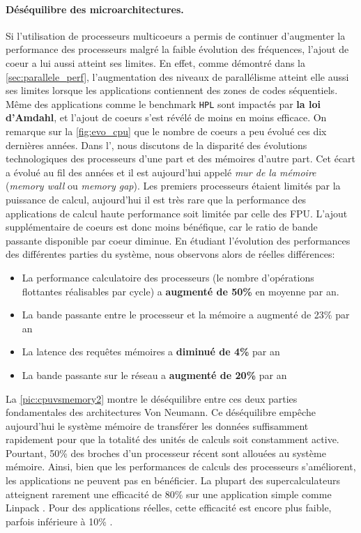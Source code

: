         \paragraph{Déséquilibre des microarchitectures.}  \label{sec:desequilibre_archi}
        Si l'utilisation de processeurs multicoeurs a permis de continuer d'augmenter la performance des processeurs malgré la faible évolution des fréquences, l'ajout de coeur a lui aussi atteint ses limites. En effet, comme démontré dans la \autoref{sec:parallele_perf}, l'augmentation des niveaux de parallélisme atteint elle aussi ses limites lorsque les applications contiennent des zones de codes séquentiels. Même des applications comme le benchmark \verb|HPL| sont impactés par \textbf{la loi d'Amdahl}, et l'ajout de coeurs s'est révélé de moins en moins efficace. On remarque sur la \autoref{fig:evo_cpu} que le nombre de coeurs a peu évolué ces dix dernières années. Dans l', nous discutons de la disparité des évolutions technologiques des processeurs d'une part et des mémoires d'autre part. Cet écart a évolué au fil des années et il est aujourd'hui appelé \textit{mur de la mémoire} \cite{Rojas1997}  (\textit{memory wall} ou \textit{memory gap}). Les premiers processeurs étaient limités par la puissance de calcul, aujourd'hui il est très rare que la performance des applications de calcul haute performance soit limitée par celle des \gls{FPU}. L'ajout supplémentaire de coeurs est donc moins bénéfique, car le ratio de bande passante disponible par coeur diminue. 
        En étudiant l'évolution des performances des différentes parties du système, nous observons alors de réelles différences:             
        \begin{itemize}                 
            \item La performance calculatoire des processeurs (le nombre d'opérations flottantes réalisables par cycle) a \textbf{augmenté de 50\%} en moyenne par an.
            \item La bande passante entre le processeur et la mémoire a augmenté de 23\% par an                 
            \item La latence des requêtes mémoires a \textbf{diminué de 4\% } par an                 
            \item La bande passante sur le réseau a \textbf{augmenté de 20\%} par an             
        \end{itemize}
            
            La \autoref{pic:cpuvsmemory2} montre le déséquilibre entre ces deux parties fondamentales des architectures Von Neumann. Ce déséquilibre empêche aujourd'hui le système mémoire de transférer les données suffisamment rapidement pour que la totalité des unités de calculs soit constamment active. Pourtant, 50\% des broches d'un processeur récent sont allouées au système mémoire. Ainsi, bien que les performances de calculs des processeurs s'améliorent, les applications ne peuvent pas en bénéficier. La plupart des supercalculateurs atteignent rarement une efficacité de 80\% sur une application simple comme Linpack \cite{Dongarra2003}. Pour des applications réelles, cette efficacité est encore plus faible, parfois inférieure à 10\% \cite{Oliker2005}.
            
